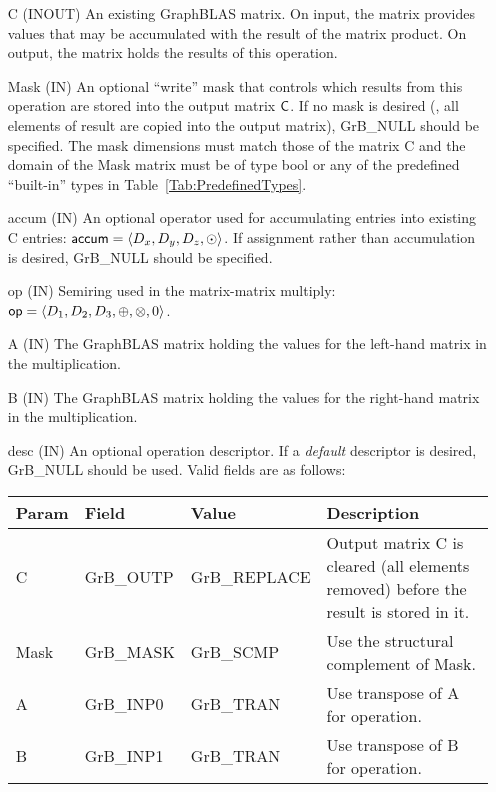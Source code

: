 \begin{itemize}[leftmargin=1.1in]
    \item[{\sf C}]    ({\sf INOUT}) An existing GraphBLAS matrix. On
    input, the matrix provides values that may be accumulated with the
    result of the matrix product.   On output, the matrix holds the
    results of this operation.

    \item[{\sf Mask}] ({\sf IN}) An optional ``write'' mask that controls which
    results from this operation are stored into the output matrix
    ${\sf C}$.  If no mask is desired (\ie, all elements
    of result are copied into the output matrix), {\sf GrB\_NULL}
    should be specified. The mask dimensions must match those of the
    matrix {\sf C} and the domain of the {\sf Mask} matrix must be
    of type {\sf bool} or any of the predefined ``built-in'' types in
    Table~\ref{Tab:PredefinedTypes}.

    \item[{\sf accum}] ({\sf IN}) An optional operator used for accumulating
    entries into existing {\sf C} entries: ${\sf accum} = \langle D_x,
    D_y, D_z,\odot \rangle$. If assignment rather than accumulation is
    desired, {\sf GrB\_NULL} should be specified.

    \item[{\sf op}]   ({\sf IN}) Semiring used in the matrix-matrix
    multiply: ${\sf op}=\langle D_1,D_2,D_3,\oplus,\otimes,0 \rangle$.

    \item[{\sf A}]    ({\sf IN}) The GraphBLAS matrix holding the values
    for the left-hand matrix in the multiplication.

    \item[{\sf B}]    ({\sf IN}) The GraphBLAS matrix holding the values
    for the right-hand matrix in the multiplication.

    \item[{\sf desc}] ({\sf IN}) An optional operation descriptor. If
    a \emph{default} descriptor is desired, {\sf GrB\_NULL} should be
    used. Valid fields are as follows:  \\

    \begin{tabular}{lllp{2.5in}}
    Param   & Field           & Value               & Description \\ \hline
    {\sf C}    & {\sf GrB\_OUTP} & {\sf GrB\_REPLACE}  & Output matrix {\sf C} is cleared (all elements removed) before the result is stored in it. \\
    {\sf Mask} & {\sf GrB\_MASK} & {\sf GrB\_SCMP}     & Use the structural complement of {\sf Mask}. \\
    {\sf A}    & {\sf GrB\_INP0} & {\sf GrB\_TRAN}     & Use transpose of {\sf A} for operation. \\
    {\sf B}    & {\sf GrB\_INP1} & {\sf GrB\_TRAN}     & Use transpose of {\sf B} for operation. \\
    \end{tabular}
\end{itemize}

